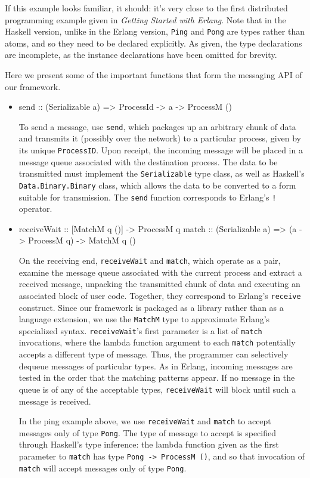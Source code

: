 \documentclass[preprint]{sigplanconf}
\begin{document}
If this example looks familiar, it should: it's very close to the first distributed programming example given in {\em Getting Started with Erlang}. Note that in the Haskell version, unlike in the Erlang version, \texttt{Ping} and \texttt{Pong} are types rather than atoms, and so they need to be declared explicitly. As given, the type declarations are incomplete, as the instance declarations have been omitted for brevity.

Here we present some of the important functions that form the messaging API of our framework.

\begin{itemize}
\item 
\begin{code}
send :: (Serializable a) => ProcessId -> a -> ProcessM ()
\end{code}

To send a message, use \texttt{send}, which packages up an arbitrary chunk of data and transmits it (possibly over the network) to a particular process, given by its unique \texttt{ProcessID}. Upon receipt, the incoming message will be placed in a message queue associated with the destination process. The data to be transmitted must implement the \texttt{Serializable} type class, as well as Haskell's \texttt{Data.Binary.Binary} class, which allows the data to be converted to a form suitable for transmission. The \texttt{send} function corresponds to Erlang's \texttt{!} operator.

\item 
\begin{code}
receiveWait :: [MatchM q ()] -> ProcessM q
match :: (Serializable a) => (a -> ProcessM q) -> MatchM q ()
\end{code}

On the receiving end, \texttt{receiveWait} and \texttt{match}, which operate as a pair, examine the message queue associated with the current process and extract a received message, unpacking the transmitted chunk of data and executing an associated block of user code. Together, they correspond to Erlang's \texttt{receive} construct. Since our framework is packaged as a library rather than as a language extension, we use the \texttt{MatchM} type to approximate Erlang's specialized syntax. \texttt{receiveWait}'s first parameter is a list of \texttt{match} invocations, where the lambda function argument to each \texttt{match} potentially accepts a different type of message. Thus, the programmer can selectively dequeue messages of particular types. As in Erlang, incoming messages are tested in the order that the matching patterns appear. If no message in the queue is of any of the acceptable types, \texttt{receiveWait} will block until such a message is received. %

In the ping example above, we use \texttt{receiveWait} and \texttt{match} to accept messages only of type \texttt{Pong}. The type of message to accept is specified through Haskell's type inference: the lambda function given as the first parameter to \texttt{match} has type \lstinline!Pong -> ProcessM ()!, and so that invocation of \texttt{match} will accept messages only of type \texttt{Pong}.
\end{itemize}
\end{document}
